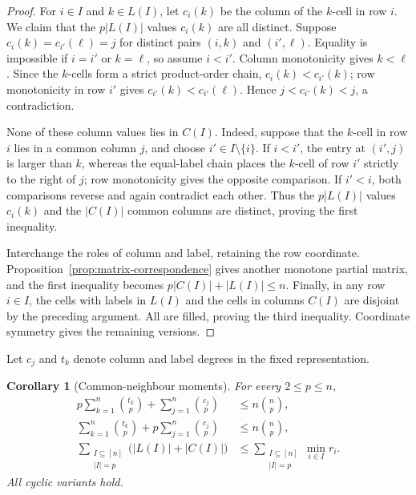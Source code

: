 \documentclass[11pt]{article}
\numberwithin{equation}{section}
\newtheorem{corollary}[theorem]{Corollary}
\theoremstyle{definition}
\theoremstyle{remark}
\begin{document}
\begin{proof}
For $i\in I$ and $k\in L(I)$, let $c_i(k)$ be the column of the $k$-cell in
row $i$.  We claim that the $p|L(I)|$ values $c_i(k)$ are all distinct.
Suppose $c_i(k)=c_{i'}(\ell)=j$ for distinct pairs $(i,k)$ and $(i',\ell)$.
Equality is impossible if $i=i'$ or $k=\ell$, so assume $i<i'$.  Column
monotonicity gives $k<\ell$.  Since the $k$-cells form a strict product-order
chain, $c_i(k)<c_{i'}(k)$; row monotonicity in row $i'$ gives
$c_{i'}(k)<c_{i'}(\ell)$.  Hence $j<c_{i'}(k)<j$, a contradiction.

None of these column values lies in $C(I)$.  Indeed, suppose that the $k$-cell
in row $i$ lies in a common column $j$, and choose $i'\in I\setminus\{i\}$.
If $i<i'$, the entry at $(i',j)$ is larger than $k$, whereas the equal-label
chain places the $k$-cell of row $i'$ strictly to the right of $j$; row
monotonicity gives the opposite comparison.  If $i'<i$, both comparisons
reverse and again contradict each other.  Thus the $p|L(I)|$ values $c_i(k)$
and the $|C(I)|$ common columns are distinct, proving the first inequality.

Interchange the roles of column and label, retaining the row coordinate.
Proposition~\ref{prop:matrix-correspondence} gives another monotone partial
matrix, and the first inequality becomes $p|C(I)|+|L(I)|\le n$.  Finally, in
any row $i\in I$, the cells with labels in $L(I)$ and the cells in columns
$C(I)$ are disjoint by the preceding argument.  All are filled, proving the
third inequality.  Coordinate symmetry gives the remaining versions.
\end{proof}

Let $c_j$ and $t_k$ denote column and label degrees in the fixed
representation.

\begin{corollary}[Common-neighbour moments]\label{cor:common-neighbour-moments}
For every $2\le p\le n$,
\begin{align}
 p\sum_{k=1}^n\binom{t_k}{p}+\sum_{j=1}^n\binom{c_j}{p}
 &\le n\binom np,\label{eq:moment-one}\\
 \sum_{k=1}^n\binom{t_k}{p}+p\sum_{j=1}^n\binom{c_j}{p}
 &\le n\binom np,\label{eq:moment-two}\\
 \sum_{\substack{I\subseteq[n]\\|I|=p}}
 \bigl(|L(I)|+|C(I)|\bigr)
 &\le
 \sum_{\substack{I\subseteq[n]\\|I|=p}}\min_{i\in I}r_i.
 \label{eq:moment-three}
\end{align}
All cyclic variants hold.
\end{corollary}
\end{document}
